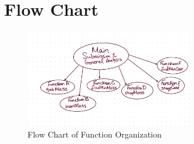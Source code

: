 \documentclass{article}
\begin{document}
\section{Flow Chart}





\begin{figure}[H]
    \centering
    \includegraphics[width=0.65\textwidth]{./main_flow_chart.png}
    \caption{Flow Chart of Function Organization}
    \label{fig: main_flow_chart}
\end{figure} 
\end{document}
